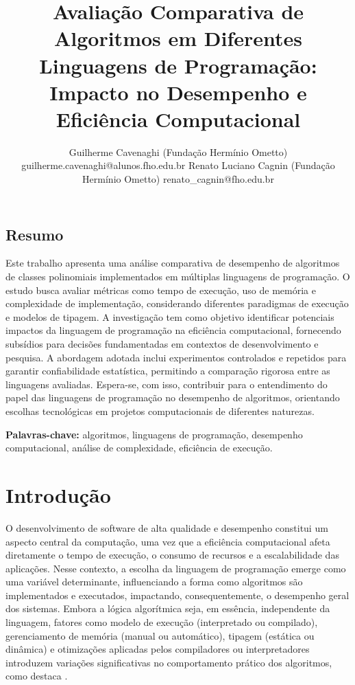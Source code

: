 \documentclass[12pt, a4paper]{article}
\title{Avaliação Comparativa de Algoritmos em Diferentes Linguagens de Programação: Impacto no Desempenho e Eficiência Computacional}
\author{Guilherme Cavenaghi (Fundação Hermínio Ometto) guilherme.cavenaghi@alunos.fho.edu.br
Renato Luciano Cagnin (Fundação Hermínio Ometto) renato\_cagnin@fho.edu.br}
\date{}
\begin{document}
\maketitle

\begin{flushleft}
\section*{Resumo}
\noindent Este trabalho apresenta uma análise comparativa de desempenho de algoritmos de classes polinomiais implementados em múltiplas linguagens de programação. O estudo busca avaliar métricas como tempo de execução, uso de memória e complexidade de implementação, considerando diferentes paradigmas de execução e modelos de tipagem. A investigação tem como objetivo identificar potenciais impactos da linguagem de programação na eficiência computacional, fornecendo subsídios para decisões fundamentadas em contextos de desenvolvimento e pesquisa. A abordagem adotada inclui experimentos controlados e repetidos para garantir confiabilidade estatística, permitindo a comparação rigorosa entre as linguagens avaliadas. Espera-se, com isso, contribuir para o entendimento do papel das linguagens de programação no desempenho de algoritmos, orientando escolhas tecnológicas em projetos computacionais de diferentes naturezas.

\vspace{0.15cm}
\noindent\textbf{Palavras-chave:} algoritmos, linguagens de programação, desempenho computacional, análise de complexidade, eficiência de execução.
\end{flushleft}


\section{Introdução}
O desenvolvimento de software de alta qualidade e desempenho constitui um aspecto central da computação, uma vez que a eficiência computacional afeta diretamente o tempo de execução, o consumo de recursos e a escalabilidade das aplicações. Nesse contexto, a escolha da linguagem de programação emerge como uma variável determinante, influenciando a forma como algoritmos são implementados e executados, impactando, consequentemente, o desempenho geral dos sistemas. Embora a lógica algorítmica seja, em essência, independente da linguagem, fatores como modelo de execução (interpretado ou compilado), gerenciamento de memória (manual ou automático), tipagem (estática ou dinâmica) e otimizações aplicadas pelos compiladores ou interpretadores introduzem variações significativas no comportamento prático dos algoritmos, como destaca .
\end{document}
